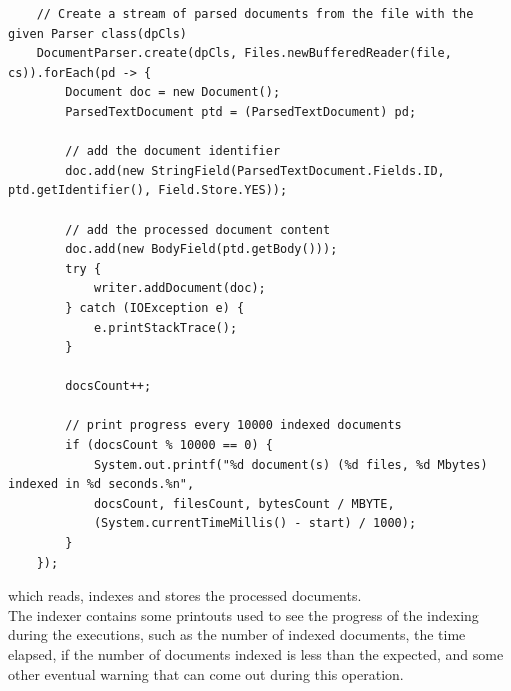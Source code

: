 \begin{lstlisting}
    // Create a stream of parsed documents from the file with the given Parser class(dpCls)
    DocumentParser.create(dpCls, Files.newBufferedReader(file, cs)).forEach(pd -> {
        Document doc = new Document();
        ParsedTextDocument ptd = (ParsedTextDocument) pd;

        // add the document identifier
        doc.add(new StringField(ParsedTextDocument.Fields.ID, ptd.getIdentifier(), Field.Store.YES));

        // add the processed document content
        doc.add(new BodyField(ptd.getBody()));
        try {
            writer.addDocument(doc);
        } catch (IOException e) {
            e.printStackTrace();
        }

        docsCount++;

        // print progress every 10000 indexed documents
        if (docsCount % 10000 == 0) {
            System.out.printf("%d document(s) (%d files, %d Mbytes) indexed in %d seconds.%n",
            docsCount, filesCount, bytesCount / MBYTE,
            (System.currentTimeMillis() - start) / 1000);
        }
    });
\end{lstlisting}
which reads, indexes and stores the processed documents. \\
The indexer contains some printouts used to see the progress of the indexing during the executions, such as the number of indexed documents, the time elapsed, if the number of documents indexed is less than the expected, and some other eventual warning that can come out during this operation.

